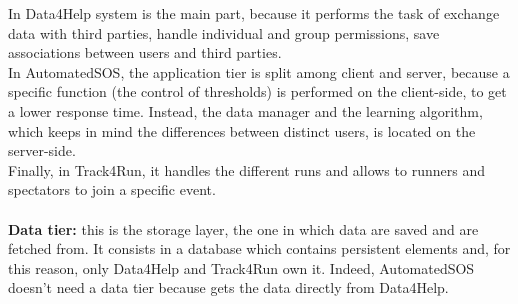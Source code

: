 \documentclass[a4paper]{article}
\begin{document}
In Data4Help system is the main part, because it performs the task of exchange data with third parties, handle individual and group permissions, save associations between users and third parties.\\
In AutomatedSOS, the application tier is split among client and server, because a specific function (the control of thresholds) is performed on the client-side, to get a lower response time. Instead, the data manager and the learning algorithm, which keeps in mind the differences between distinct users, is located on the server-side.\\
Finally, in Track4Run, it handles the different runs and allows to runners and spectators to join a specific event.\\ \\
\textbf{Data tier:} this is the storage layer, the one in which data are saved and are fetched from. It consists in a database which contains persistent elements and, for this reason, only Data4Help and Track4Run own it. Indeed, AutomatedSOS doesn't need a data tier because gets the data directly from Data4Help.
\clearpage
\end{document}
